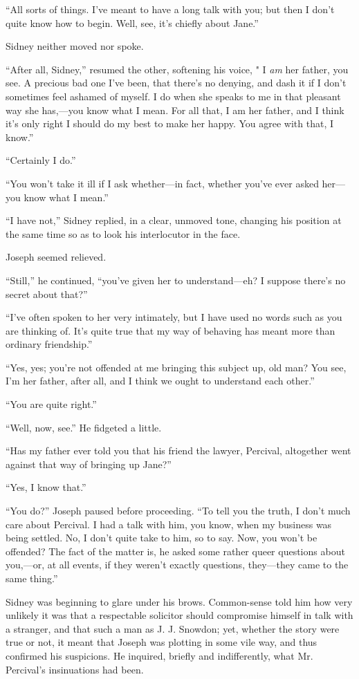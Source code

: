 {}``All sorts of things. I've meant to have a long talk with you; but
then I don't quite know how to begin. Well, see, it's chiefly about
Jane.''

Sidney neither moved nor spoke.

``After all, Sidney,'' resumed the other, softening his voice, " I
\emph{am} her father, you see. A precious bad one I've been, that
there's no denying, and dash it if I don't sometimes feel ashamed of
myself. I do when she speaks to me in that pleasant way she has,---you
know what I mean. For all that, I am her father, and I think it's only
right I should do my best to make her happy. You agree with that, I
know.''

``Certainly I do.''

``You won't take it ill if I ask whether---in fact, whether you've ever
asked her---you know what I mean.''

``I have not,'' Sidney replied, in a clear, unmoved tone, changing his
position at the same time so as to look his interlocutor in the face.

Joseph seemed relieved.

{}``Still,'' he continued, ``you've given her to understand---eh? I
suppose there's no secret about that?''

``I've often spoken to her very intimately, but I have used no words
such as you are thinking of. It's quite true that my way of behaving has
meant more than ordinary friendship.''

``Yes, yes; you're not offended at me bringing this subject up, old man?
You see, I'm her father, after all, and I think we ought to understand
each other.''

``You are quite right.''

``Well, now, see.'' He fidgeted a little.

``Has my father ever told you that his friend the lawyer, Percival,
altogether went against that way of bringing up Jane?''

``Yes, I know that.''

``You do?'' Joseph paused before proceeding. ``To tell you the truth, I
don't much care about Percival. I had a talk with him, you know, when my
business was being settled. No, I don't quite take to him, so to say.
Now, you won't be offended? The fact {}of the matter is, he asked some
rather queer questions about you,---or, at all events, if they weren't
exactly questions, they---they came to the same thing.''

Sidney was beginning to glare under his brows. Common-sense told him how
very unlikely it was that a respectable solicitor should compromise
himself in talk with a stranger, and that such a man as J. J. Snowdon;
yet, whether the story were true or not, it meant that Joseph was
plotting in some vile way, and thus confirmed his suspicions. He
inquired, briefly and indifferently, what Mr. Percival's insinuations
had been.

